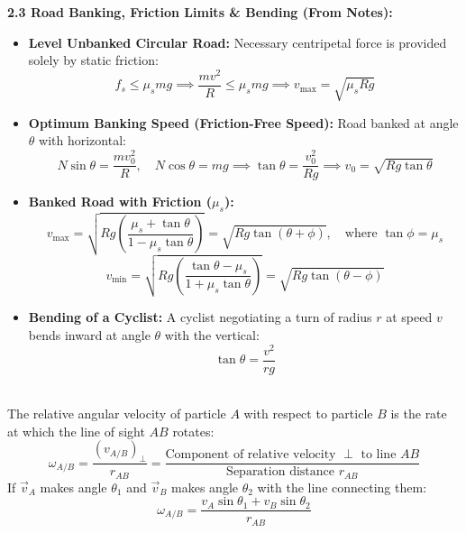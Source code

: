 \documentclass[11pt,a4paper]{article}
\begin{document}
\vspace{4pt}
\begin{tcolorbox}[formulacard]
  \textbf{\textcolor{primaryDark}{2.3 Road Banking, Friction Limits \& Bending (From Notes):}}
  \begin{itemize}[leftmargin=14pt,itemsep=2.5pt]
    \item \textbf{Level Unbanked Circular Road:} Necessary centripetal force is provided solely by static friction:
    \[
      f_s \le \mu_s mg \implies \frac{mv^2}{R} \le \mu_s mg \implies v_{\max} = \sqrt{\mu_s R g}
    \]
    \item \textbf{Optimum Banking Speed (Friction-Free Speed):} Road banked at angle $\theta$ with horizontal:
    \[
      N\sin\theta = \frac{mv_0^2}{R}, \quad N\cos\theta = mg \implies \tan\theta = \frac{v_0^2}{Rg} \implies v_0 = \sqrt{Rg\tan\theta}
    \]
    \item \textbf{Banked Road with Friction ($\mu_s$):}
    \[
      v_{\max} = \sqrt{Rg\left(\frac{\mu_s + \tan\theta}{1 - \mu_s\tan\theta}\right)} = \sqrt{Rg\tan(\theta + \phi)}, \quad \text{where } \tan\phi = \mu_s
    \]
    \[
      v_{\min} = \sqrt{Rg\left(\frac{\tan\theta - \mu_s}{1 + \mu_s\tan\theta}\right)} = \sqrt{Rg\tan(\theta - \phi)}
    \]
    \item \textbf{Bending of a Cyclist:} A cyclist negotiating a turn of radius $r$ at speed $v$ bends inward at angle $\theta$ with the vertical:
    \[
      \tan\theta = \frac{v^2}{rg}
    \]
  \end{itemize}
\end{tcolorbox}

\vspace{5pt}
\noindent{\large\textbf{\textsf{\textcolor{primaryDark}{2.4 Relative Angular Velocity (From Notes)}}}}\\[3pt]
The relative angular velocity of particle $A$ with respect to particle $B$ is the rate at which the line of sight $AB$ rotates:
\[
  \omega_{A/B} = \frac{(v_{A/B})_\perp}{r_{AB}} = \frac{\text{Component of relative velocity } \perp \text{ to line } AB}{\text{Separation distance } r_{AB}}
\]
If $\vec{v}_A$ makes angle $\theta_1$ and $\vec{v}_B$ makes angle $\theta_2$ with the line connecting them:
\[
  \omega_{A/B} = \frac{v_A\sin\theta_1 + v_B\sin\theta_2}{r_{AB}}
\]
\end{document}
